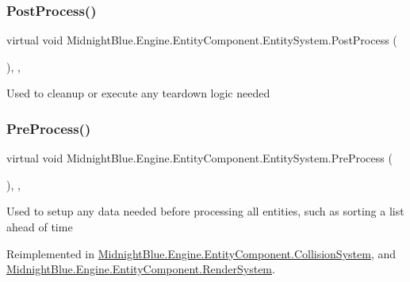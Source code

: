 \subsubsection{\texorpdfstring{Post\+Process()}{PostProcess()}}
{\footnotesize\ttfamily virtual void Midnight\+Blue.\+Engine.\+Entity\+Component.\+Entity\+System.\+Post\+Process (\begin{DoxyParamCaption}{ }\end{DoxyParamCaption})\hspace{0.3cm}{\ttfamily [inline]}, {\ttfamily [protected]}, {\ttfamily [virtual]}}



Used to cleanup or execute any teardown logic needed 

\hypertarget{class_midnight_blue_1_1_engine_1_1_entity_component_1_1_entity_system_a779da2924653b4402ca386dbc52bd3b1}{}\label{class_midnight_blue_1_1_engine_1_1_entity_component_1_1_entity_system_a779da2924653b4402ca386dbc52bd3b1} 
\subsubsection{\texorpdfstring{Pre\+Process()}{PreProcess()}}
{\footnotesize\ttfamily virtual void Midnight\+Blue.\+Engine.\+Entity\+Component.\+Entity\+System.\+Pre\+Process (\begin{DoxyParamCaption}{ }\end{DoxyParamCaption})\hspace{0.3cm}{\ttfamily [inline]}, {\ttfamily [protected]}, {\ttfamily [virtual]}}



Used to setup any data needed before processing all entities, such as sorting a list ahead of time 



Reimplemented in \hyperlink{class_midnight_blue_1_1_engine_1_1_entity_component_1_1_collision_system_ab85ff8fd81369e705c461f58014f5ec2}{Midnight\+Blue.\+Engine.\+Entity\+Component.\+Collision\+System}, and \hyperlink{class_midnight_blue_1_1_engine_1_1_entity_component_1_1_render_system_a0c3d20164cc31ae45aa5e0814b08f08f}{Midnight\+Blue.\+Engine.\+Entity\+Component.\+Render\+System}.

